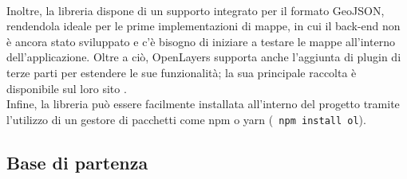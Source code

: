 
\\Inoltre, la libreria dispone di un supporto integrato per il formato GeoJSON, rendendola ideale per le prime implementazioni di mappe, in cui il back-end non è ancora stato sviluppato e c'è bisogno di iniziare a testare le mappe all'interno dell'applicazione. Oltre a ciò, OpenLayers supporta anche l'aggiunta di plugin di terze parti per estendere le sue funzionalità; la sua principale raccolta è disponibile sul loro sito \cite{DocumentazioneOpenLayersPlugin}{}.
\\Infine, la libreria può essere facilmente installata all'interno del progetto tramite l'utilizzo di un gestore di pacchetti come npm o yarn (\texttt{\textdollar\ npm install ol}).

\subsection{Base di partenza}

